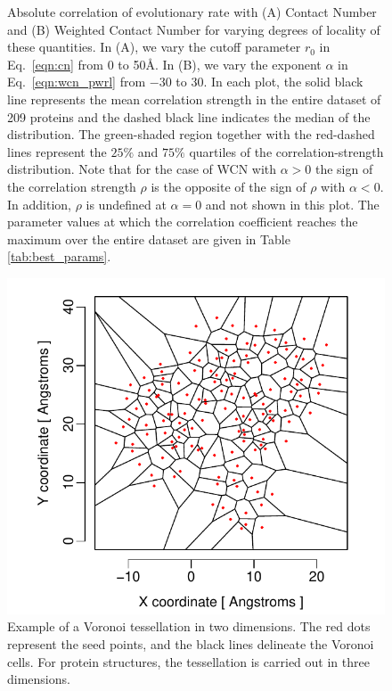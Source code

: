 \documentclass[12pt]{article}
\begin{document}
\begin{figure}[h]
        \caption{Absolute correlation of evolutionary rate with (A) Contact Number and (B) Weighted Contact Number for varying degrees of locality of these quantities. In (A), we vary the cutoff parameter $r_0$ in Eq.~\ref{eqn:cn} from 0 to 50\AA. In (B), we vary the exponent $\alpha$ in Eq.~\ref{eqn:wcn_pwrl} from $-30$ to 30. In each plot, the solid black line represents the mean correlation strength in the entire dataset of 209 proteins and the dashed black line indicates the median of the distribution. The green-shaded region together with the red-dashed lines represent the $25\%$ and $75\%$ quartiles of the correlation-strength distribution. Note that for the case of WCN with $\alpha>0$ the sign of the correlation strength $\rho$ is the opposite of the sign of $\rho$ with $\alpha<0$. In addition, $\rho$ is undefined at $\alpha=0$ and not shown in this plot. The parameter values at which the correlation coefficient reaches the maximum over the entire dataset are given in Table \ref{tab:best_params}.}
        \label{fig:cnwcnp}
    \end{figure}

    \begin{figure}
        \begin{center}
        \includegraphics[width=6in]{voronoi_diagram.pdf}
        \end{center}
        \caption{Example of a Voronoi tessellation in two dimensions. The red dots represent the seed points, and the black lines delineate the Voronoi cells. For protein structures, the tessellation is carried out in three dimensions.}
        \label{fig:voronoi}
    \end{figure}
\end{document}
